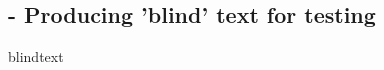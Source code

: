 
\subsection{ - Producing 'blind' text for testing}

\begin{demo}{}{blindtext}
	\blindmathtrue
	\blindtoctrue
	\Blinddocument
\end{demo}
